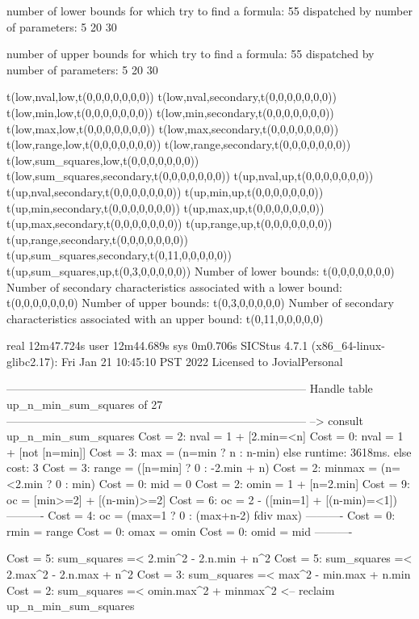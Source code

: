 number of lower bounds for which try to find a formula: 55
dispatched by number of parameters: 5  20  30

number of upper bounds for which try to find a formula: 55
dispatched by number of parameters: 5  20  30

t(low,nval,low,t(0,0,0,0,0,0,0))
t(low,nval,secondary,t(0,0,0,0,0,0,0))
t(low,min,low,t(0,0,0,0,0,0,0))
t(low,min,secondary,t(0,0,0,0,0,0,0))
t(low,max,low,t(0,0,0,0,0,0,0))
t(low,max,secondary,t(0,0,0,0,0,0,0))
t(low,range,low,t(0,0,0,0,0,0,0))
t(low,range,secondary,t(0,0,0,0,0,0,0))
t(low,sum_squares,low,t(0,0,0,0,0,0,0))
t(low,sum_squares,secondary,t(0,0,0,0,0,0,0))
t(up,nval,up,t(0,0,0,0,0,0,0))
t(up,nval,secondary,t(0,0,0,0,0,0,0))
t(up,min,up,t(0,0,0,0,0,0,0))
t(up,min,secondary,t(0,0,0,0,0,0,0))
t(up,max,up,t(0,0,0,0,0,0,0))
t(up,max,secondary,t(0,0,0,0,0,0,0))
t(up,range,up,t(0,0,0,0,0,0,0))
t(up,range,secondary,t(0,0,0,0,0,0,0))
t(up,sum_squares,secondary,t(0,11,0,0,0,0,0))
t(up,sum_squares,up,t(0,3,0,0,0,0,0))
Number of lower bounds:                                             t(0,0,0,0,0,0,0)
Number of secondary characteristics associated with a lower bound:  t(0,0,0,0,0,0,0)
Number of upper bounds:                                             t(0,3,0,0,0,0,0)
Number of secondary characteristics associated with an upper bound: t(0,11,0,0,0,0,0)

real	12m47.724s
user	12m44.689s
sys	0m0.706s
SICStus 4.7.1 (x86_64-linux-glibc2.17): Fri Jan 21 10:45:10 PST 2022
Licensed to JovialPersonal


--------------------------------------------------------------------------------
Handle table up_n_min_sum_squares of 27
--------------------------------------------------------------------------------
--> consult up_n_min_sum_squares
Cost =  2:  nval   = 1 + [2.min=<n]
Cost =  0:  nval   = 1 + [not [n=min]]
Cost =  3:  max    = (n=min ? n : n-min)
else runtime: 3618ms. else cost: 3
Cost =  3:  range  = ([n=min] ? 0 : -2.min + n) %
Cost =  2:  minmax = (n=<2.min ? 0 : min)
Cost =  0:  mid    = 0
Cost =  2:  omin   = 1 + [n=2.min]
Cost =  9:  oc     = [min>=2] + [(n-min)>=2]
Cost =  6:  oc     = 2 - ([min=1] + [(n-min)=<1])
----------
Cost =  4:  oc     = (max=1 ? 0 : (max+n-2) fdiv max)
----------
Cost =  0:  rmin   = range
Cost =  0:  omax   = omin
Cost =  0:  omid   = mid
----------

Cost =  5:  sum_squares =< 2.min^2 - 2.n.min + n^2
Cost =  5:  sum_squares =< 2.max^2 - 2.n.max + n^2
Cost =  3:  sum_squares =< max^2 - min.max + n.min
Cost =  2:  sum_squares =< omin.max^2 + minmax^2
<-- reclaim up_n_min_sum_squares

